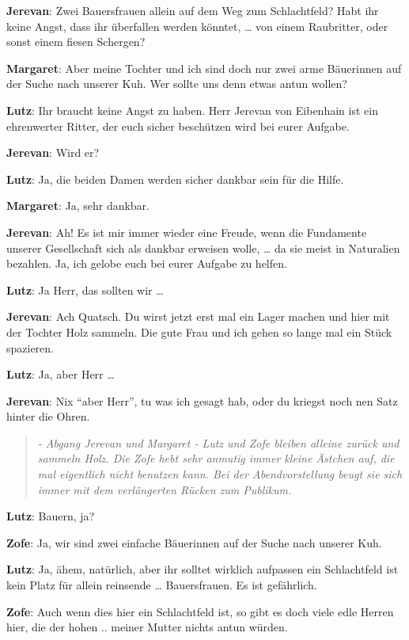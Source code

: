 \documentclass[a5paper,7pt, twocolumn]{book}
\begin{document}
\textbf{Jerevan}: Zwei Bauersfrauen allein auf dem Weg zum Schlachtfeld? Habt ihr keine Angst, dass ihr überfallen werden könntet, … von einem Raubritter, oder sonst einem fiesen Schergen?

\textbf{Margaret}: Aber meine Tochter und ich sind doch nur zwei arme Bäuerinnen auf der Suche nach unserer Kuh. Wer sollte uns denn etwas antun wollen?

\textbf{Lutz}: Ihr braucht keine Angst zu haben. Herr Jerevan von Eibenhain ist ein ehrenwerter Ritter, der euch sicher beschützen wird bei eurer Aufgabe.

\textbf{Jerevan}: Wird er?

\textbf{Lutz}: Ja, die beiden Damen werden sicher dankbar sein für die Hilfe.

\textbf{Margaret}: Ja, sehr dankbar.

\textbf{Jerevan}: Ah! Es ist mir immer wieder eine Freude, wenn die Fundamente unserer Gesellschaft sich als dankbar erweisen wolle, … da sie meist in Naturalien bezahlen.
Ja, ich gelobe euch bei eurer Aufgabe zu helfen.

\textbf{Lutz}: Ja Herr, das sollten wir …

\textbf{Jerevan}: Ach Quatsch. Du wirst jetzt erst mal ein Lager machen und hier mit der Tochter Holz sammeln. Die gute Frau und ich gehen so lange mal ein Stück spazieren.

\textbf{Lutz}: Ja, aber Herr …

\textbf{Jerevan}: Nix “aber Herr”, tu was ich gesagt hab, oder du kriegst noch nen Satz hinter die Ohren.

\begin{quote}
  \textit{- Abgang Jerevan und Margaret - Lutz und Zofe bleiben alleine zurück und sammeln Holz. Die Zofe hebt sehr anmutig immer kleine Ästchen auf, die mal eigentlich nicht benutzen kann.
Bei der Abendvorstellung beugt sie sich immer mit dem verlängerten Rücken zum Publikum.}
 \end{quote}

\textbf{Lutz}: Bauern, ja?

\textbf{Zofe}: Ja, wir sind zwei einfache Bäuerinnen auf der Suche nach unserer Kuh.

\textbf{Lutz}: Ja, ähem, natürlich, aber ihr solltet wirklich aufpassen ein Schlachtfeld ist kein Platz für allein reinsende … Bauersfrauen. Es ist gefährlich.

\textbf{Zofe}: Auch wenn dies hier ein Schlachtfeld ist, so gibt es doch viele edle Herren hier, die der hohen .. meiner Mutter nichts antun würden.
\end{document}
